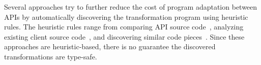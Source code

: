 

 Several approaches try to
further reduce the cost of program adaptation between APIs by
automatically discovering the transformation program using heuristic
rules. The heuristic rules range from comparing API source code~\cite{dig-ecoop},
analyzing existing client source
code~\cite{graph-oopsla,spatch,gpatch}, and discovering similar code
pieces~\cite{sediting}. Since these approaches are heuristic-based,
there is no guarantee the discovered transformations are type-safe.
  


